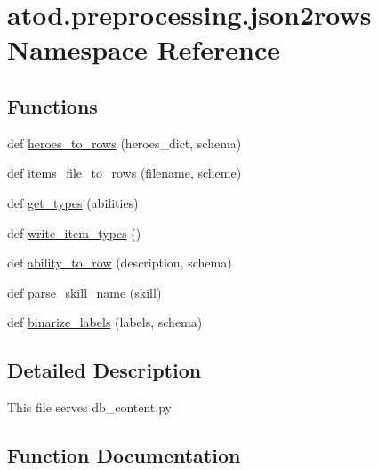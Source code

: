 \hypertarget{namespaceatod_1_1preprocessing_1_1json2rows}{}\section{atod.\+preprocessing.\+json2rows Namespace Reference}
\label{namespaceatod_1_1preprocessing_1_1json2rows}
\subsection*{Functions}
\begin{DoxyCompactItemize}
\item 
def \hyperlink{namespaceatod_1_1preprocessing_1_1json2rows_aca0916ae8c843be5b3b2d360eaa45a17}{heroes\+\_\+to\+\_\+rows} (heroes\+\_\+dict, schema)
\item 
def \hyperlink{namespaceatod_1_1preprocessing_1_1json2rows_a0e3cbdd5b06afe78e4369af2ad5434df}{items\+\_\+file\+\_\+to\+\_\+rows} (filename, scheme)
\item 
def \hyperlink{namespaceatod_1_1preprocessing_1_1json2rows_a41bbe156f01c4c09a663c0ad68e8f34e}{get\+\_\+types} (abilities)
\item 
def \hyperlink{namespaceatod_1_1preprocessing_1_1json2rows_af7414ebc4ac808d3e924fc5ed9b0dcf7}{write\+\_\+item\+\_\+types} ()
\item 
def \hyperlink{namespaceatod_1_1preprocessing_1_1json2rows_a13cee5b99c6b24bf2aebfd374d621d2a}{ability\+\_\+to\+\_\+row} (description, schema)
\item 
def \hyperlink{namespaceatod_1_1preprocessing_1_1json2rows_a33276be2c103ee6ca25228cee80ae123}{parse\+\_\+skill\+\_\+name} (skill)
\item 
def \hyperlink{namespaceatod_1_1preprocessing_1_1json2rows_af27be16be3e7c0d2ad8a7e6af62bec2f}{binarize\+\_\+labels} (labels, schema)
\end{DoxyCompactItemize}


\subsection{Detailed Description}
\begin{DoxyVerb}This file serves db_content.py  \end{DoxyVerb}
 

\subsection{Function Documentation}

